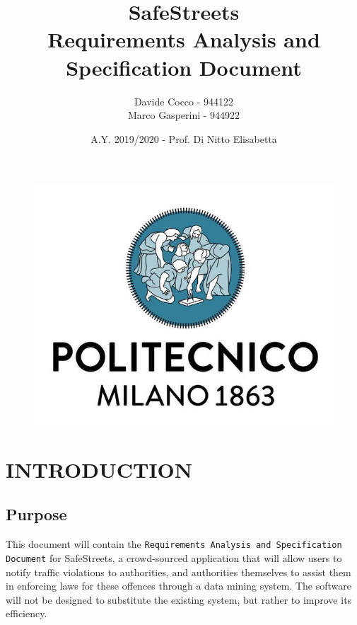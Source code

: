 \documentclass[12pt,a4paper]{article}
\author{Davide Cocco - 944122\\
	Marco Gasperini - 944922}
\date{A.Y. 2019/2020 - Prof. Di Nitto Elisabetta}
\title{
	\textbf{\Huge{SafeStreets}} \\
	\large Requirements Analysis and Specification Document
}
\begin{document}
	\begin{figure}
		\centering
		\includegraphics[width=1.0\linewidth]{Images/polimi.jpg}
	\end{figure}

	\maketitle
	\newpage
	\tableofcontents
	\newpage

\section{INTRODUCTION}
\subsection{Purpose} 
This document will contain the \texttt{Requirements Analysis and Specification Document} for SafeStreets, a crowd-sourced application that will allow users to notify traffic violations to authorities, and authorities themselves to assist them in enforcing laws for these offences through a data mining system. The software will not be designed to substitute the existing system, but rather to improve its efficiency.
 
\end{document}
